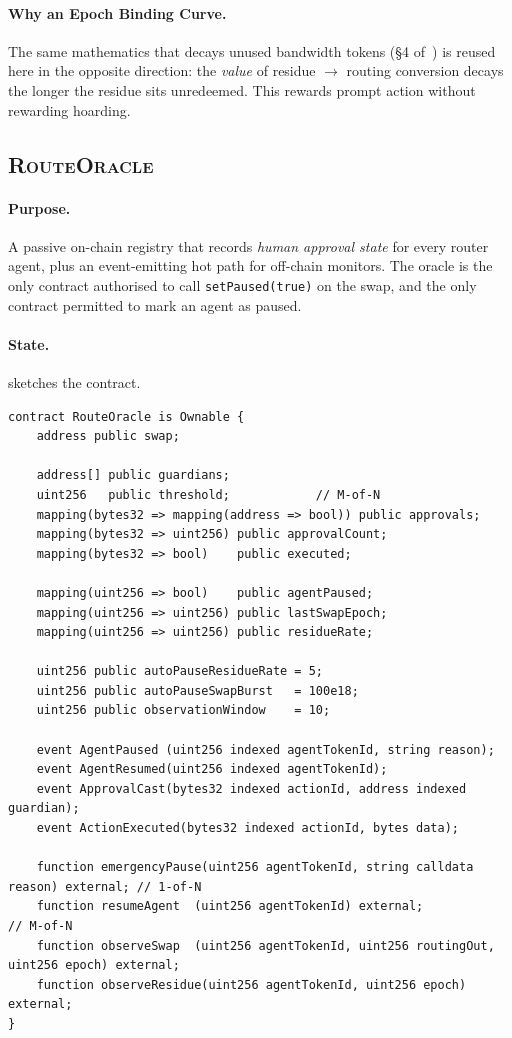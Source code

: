 \documentclass[11pt,twocolumn]{article}
\theoremstyle{definition}
\theoremstyle{plain}
\theoremstyle{remark}
\newcommand{\contractname}[1]{\textsc{#1}}
\newcommand{\code}[1]{\texttt{#1}}
\begin{document}
\paragraph{Why an Epoch Binding Curve.} The same mathematics that decays unused bandwidth tokens (\S 4 of~\cite{ecca2026}) is reused here in the opposite direction: the \emph{value} of residue $\to$ routing conversion decays the longer the residue sits unredeemed. This rewards prompt action without rewarding hoarding.

\subsection{\contractname{RouteOracle}}\label{ssec:oracle}

\paragraph{Purpose.} A passive on-chain registry that records \emph{human approval state} for every router agent, plus an event-emitting hot path for off-chain monitors. The oracle is the only contract authorised to call \code{setPaused(true)} on the swap, and the only contract permitted to mark an agent as paused.

\paragraph{State.}  sketches the contract.

\begin{lstlisting}[caption={\contractname{RouteOracle} interface (abridged).},label={lst:oracle}]
contract RouteOracle is Ownable {
    address public swap;

    address[] public guardians;
    uint256   public threshold;            // M-of-N
    mapping(bytes32 => mapping(address => bool)) public approvals;
    mapping(bytes32 => uint256) public approvalCount;
    mapping(bytes32 => bool)    public executed;

    mapping(uint256 => bool)    public agentPaused;
    mapping(uint256 => uint256) public lastSwapEpoch;
    mapping(uint256 => uint256) public residueRate;

    uint256 public autoPauseResidueRate = 5;
    uint256 public autoPauseSwapBurst   = 100e18;
    uint256 public observationWindow    = 10;

    event AgentPaused (uint256 indexed agentTokenId, string reason);
    event AgentResumed(uint256 indexed agentTokenId);
    event ApprovalCast(bytes32 indexed actionId, address indexed guardian);
    event ActionExecuted(bytes32 indexed actionId, bytes data);

    function emergencyPause(uint256 agentTokenId, string calldata reason) external; // 1-of-N
    function resumeAgent  (uint256 agentTokenId) external;                         // M-of-N
    function observeSwap  (uint256 agentTokenId, uint256 routingOut, uint256 epoch) external;
    function observeResidue(uint256 agentTokenId, uint256 epoch) external;
}
\end{lstlisting}
\end{document}
